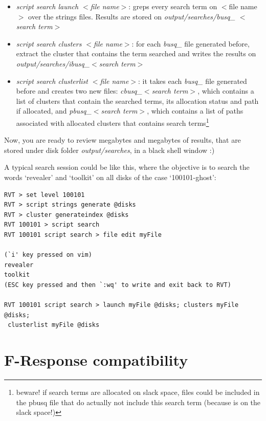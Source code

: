 \documentclass[a4paper,11pt,oneside]{report}
\begin{document}
\begin{itemize}
\item \emph{script search launch $<$file name$>$}:   greps every search term on $<$file name$>$ over the strings files. Results are stored on \emph{output/searches/busq\_ $<$search term$>$}
\item \emph{script search clusters $<$file name$>$}:    for each \emph{busq\_} file generated before, extract the cluster that contains the term searched and writes the results on \emph{output/searches/ibusq\_$<$search term$>$}
\item \emph{script search clusterlist $<$file name$>$}:   it takes each \emph{busq\_} file generated before and creates two new files: \emph{cbusq\_$<$search term$>$}, which contains a list of clusters that contain the searched terms, its allocation status and path if allocated, and  \emph{pbusq\_$<$search term$>$}, which contains a list of paths associated with allocated clusters that contains search terms\footnote{beware! if search terms are allocated on slack space, files could be included in the pbusq file that do actually not include this search term (because is on the slack space!)}
\end{itemize}

Now, you are ready to review megabytes and megabytes of results, that are stored under disk folder \emph{output/searches}, in a black shell window   :)

A typical search session could be like this, where the objective is to search the words `revealer' and `toolkit' on all disks of the case `100101-ghost':

\begin{verbatim}
RVT > set level 100101
RVT > script strings generate @disks
RVT > cluster generateindex @disks
RVT 100101 > script search
RVT 100101 script search > file edit myFile

(`i' key pressed on vim)
revealer
toolkit
(ESC key pressed and then `:wq' to write and exit back to RVT)

RVT 100101 script search > launch myFile @disks; clusters myFile @disks; 
 clusterlist myFile @disks

\end{verbatim}





\section{F-Response compatibility}
\end{document}
